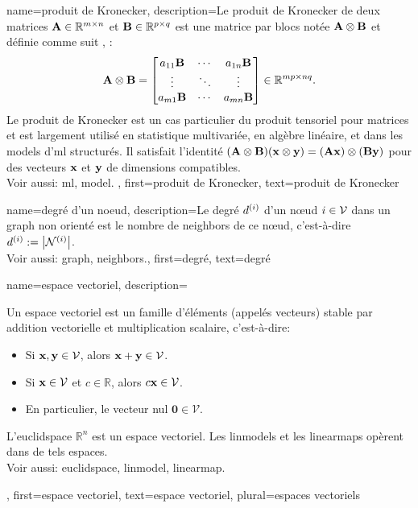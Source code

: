 {name={produit de Kronecker}, 
	description={Le produit de Kronecker  de deux matrices ${\bf A} \in \mathbb{R}^{m \times n}$ 
		et ${\bf B} \in \mathbb{R}^{p \times q}$ est une matrice par blocs notée ${\bf A} \otimes {\bf B}$ 
		et définie comme suit \cite{GolubVanLoanBook}, \cite{HornMatAnalysis}:
		\[
		{\bf A} \otimes {\bf B} =
		\begin{bmatrix}
			a_{11}{\bf B} & \cdots & a_{1n}{\bf B} \\
			\vdots & \ddots & \vdots \\
			a_{m1}{\bf B} & \cdots & a_{mn}{\bf B}
		\end{bmatrix}
		\in \mathbb{R}^{mp \times nq}.
		\]
		Le produit de Kronecker est un cas particulier du produit tensoriel pour matrices et est largement utilisé en statistique multivariée, en algèbre linéaire, et dans les \glspl{model} d'\gls{ml} structurés.  
		Il satisfait l’identité $({\bf A} \otimes {\bf B})({\bf x} \otimes {\bf y}) = ({\bf A}{\bf x}) \otimes ({\bf B}{\bf y})$ pour des vecteurs ${\bf x}$ et ${\bf y}$ de dimensions compatibles.
		\\
		Voir aussi: \gls{ml}, \gls{model}. },
	first={produit de Kronecker},
	text={produit de Kronecker} 
}

{name={degré d’un noeud},
	description={Le degré $d^{(i)}$ d’un nœud $i \in \mathcal{V}$ 
		dans un \gls{graph} non orienté est le nombre de \gls{neighbors} de ce nœud, c’est-à-dire 
		$d^{(i)} := \big|\mathcal{N}^{(i)}\big|$.
		\\ 
		Voir aussi: \gls{graph}, \gls{neighbors}.},
	first={degré},
	text={degré} 
}

{name={espace vectoriel},
	description={Un espace vectoriel est un famille d’éléments 
		(appelés vecteurs) stable par addition vectorielle et multiplication scalaire, c’est-à-dire:
		\begin{itemize}
			\item Si ${\bf x}, {\bf y} \in \mathcal{V}$, alors ${\bf x} + {\bf y} \in \mathcal{V}$.
			\item Si ${\bf x} \in \mathcal{V}$ et $c \in \mathbb{R}$, alors $c {\bf x} \in \mathcal{V}$.
			\item En particulier, le vecteur nul $\mathbf{0} \in \mathcal{V}$.
		\end{itemize}
		L’\gls{euclidspace} $\mathbb{R}^n$ est un espace vectoriel.
		Les \glspl{linmodel} et les \glspl{linearmap} opèrent dans de tels espaces.
		\\
		Voir aussi: \gls{euclidspace}, \gls{linmodel}, \gls{linearmap}.},
	first={espace vectoriel},
	text={espace vectoriel}, plural={espaces vectoriels}
}